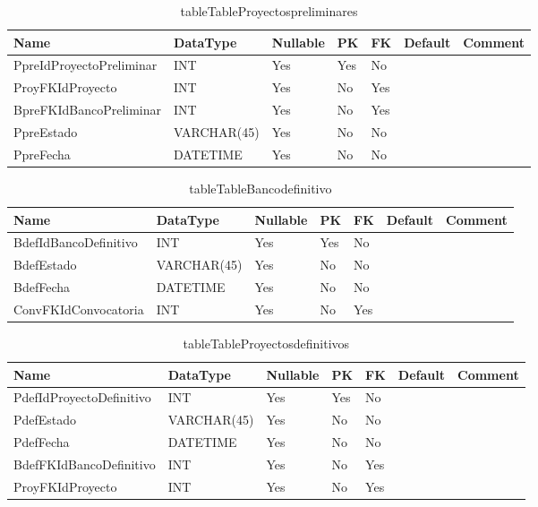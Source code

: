 \begin{table}
	\caption{tableTableProyectospreliminares}
	\label{labelTableProyectospreliminares}
	\begin{tabular}{ |l|l|l|l|l|l|l| }
		\hline
		Name & DataType & Nullable & PK & FK & Default & Comment \\ \hline
		PpreIdProyectoPreliminar & INT & Yes & Yes & No &  & \\ \hline 
		ProyFKIdProyecto & INT & Yes & No & Yes &  & \\ \hline 
		BpreFKIdBancoPreliminar & INT & Yes & No & Yes &  & \\ \hline 
		PpreEstado & VARCHAR(45) & Yes & No & No &  & \\ \hline 
		PpreFecha & DATETIME & Yes & No & No &  & \\ \hline 
		
	\end{tabular}
\end{table}


\begin{table}
	\caption{tableTableBancodefinitivo}
	\label{labelTableBancodefinitivo}
	\begin{tabular}{ |l|l|l|l|l|l|l| }
		\hline
		Name & DataType & Nullable & PK & FK & Default & Comment \\ \hline
		BdefIdBancoDefinitivo & INT & Yes & Yes & No &  & \\ \hline 
		BdefEstado & VARCHAR(45) & Yes & No & No &  & \\ \hline 
		BdefFecha & DATETIME & Yes & No & No &  & \\ \hline 
		ConvFKIdConvocatoria & INT & Yes & No & Yes &  & \\ \hline 
		
	\end{tabular}
\end{table}


\begin{table}
	\caption{tableTableProyectosdefinitivos}
	\label{labelTableProyectosdefinitivos}
	\begin{tabular}{ |l|l|l|l|l|l|l| }
		\hline
		Name & DataType & Nullable & PK & FK & Default & Comment \\ \hline
		PdefIdProyectoDefinitivo & INT & Yes & Yes & No &  & \\ \hline 
		PdefEstado & VARCHAR(45) & Yes & No & No &  & \\ \hline 
		PdefFecha & DATETIME & Yes & No & No &  & \\ \hline 
		BdefFKIdBancoDefinitivo & INT & Yes & No & Yes &  & \\ \hline 
		ProyFKIdProyecto & INT & Yes & No & Yes &  & \\ \hline 
		
	\end{tabular}
\end{table}


